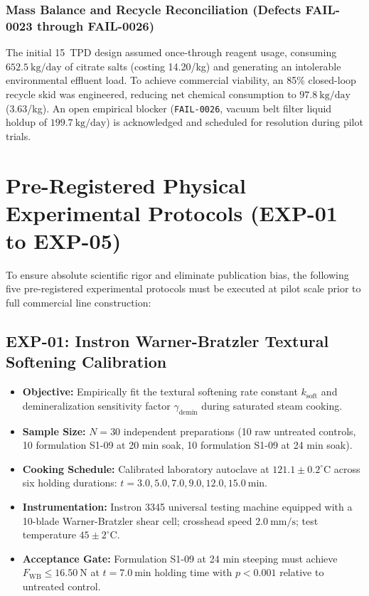 \documentclass[10pt,a4paper]{article}
\newcommand{\inr}{\text{INR~}}
\begin{document}
\subsubsection{Mass Balance and Recycle Reconciliation (Defects FAIL-0023 through FAIL-0026)}
The initial 15~TPD design assumed once-through reagent usage, consuming $652.5\ \mathrm{kg/day}$ of citrate salts (costing \inr14.20/kg) and generating an intolerable environmental effluent load. To achieve commercial viability, an 85\% closed-loop recycle skid was engineered, reducing net chemical consumption to $97.8\ \mathrm{kg/day}$ (\inr3.63/kg). An open empirical blocker (\texttt{FAIL-0026}, vacuum belt filter liquid holdup of $199.7\ \mathrm{kg/day}$) is acknowledged and scheduled for resolution during pilot trials.


\section{Pre-Registered Physical Experimental Protocols (EXP-01 to EXP-05)}

To ensure absolute scientific rigor and eliminate publication bias, the following five pre-registered experimental protocols must be executed at pilot scale prior to full commercial line construction:

\subsection{EXP-01: Instron Warner-Bratzler Textural Softening Calibration}
\begin{itemize}[leftmargin=1.5em]
    \item \textbf{Objective:} Empirically fit the textural softening rate constant $k_{\mathrm{soft}}$ and demineralization sensitivity factor $\gamma_{\mathrm{demin}}$ during saturated steam cooking.
    \item \textbf{Sample Size:} $N = 30$ independent preparations (10 raw untreated controls, 10 formulation S1-09 at 20 min soak, 10 formulation S1-09 at 24 min soak).
    \item \textbf{Cooking Schedule:} Calibrated laboratory autoclave at $121.1 \pm 0.2^\circ\mathrm{C}$ across six holding durations: $t = 3.0, 5.0, 7.0, 9.0, 12.0, 15.0\ \mathrm{min}$.
    \item \textbf{Instrumentation:} Instron 3345 universal testing machine equipped with a 10-blade Warner-Bratzler shear cell; crosshead speed $2.0\ \mathrm{mm/s}$; test temperature $45 \pm 2^\circ\mathrm{C}$.
    \item \textbf{Acceptance Gate:} Formulation S1-09 at 24 min steeping must achieve $F_{\mathrm{WB}} \le 16.50\ \mathrm{N}$ at $t = 7.0\ \mathrm{min}$ holding time with $p < 0.001$ relative to untreated control.
\end{itemize}
\end{document}
